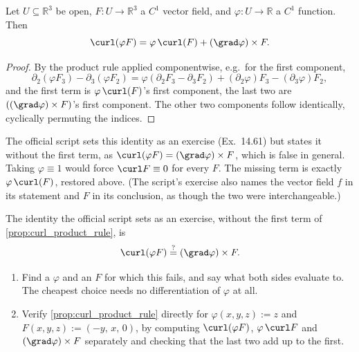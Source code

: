 \begin{proposition}
\label{prop:curl_product_rule}
Let $U \subseteq \mathbb{R}^3$ be open, $F : U \to \mathbb{R}^3$ a $C^1$ vector field, and
$\varphi : U \to \mathbb{R}$ a $C^1$ function. Then
\[\curl(\varphi F) = \varphi\,\curl(F) + (\grad\varphi)\times F.\]
\end{proposition}

\begin{proof}
By the product rule applied componentwise, e.g.\ for the first component,
\[\partial_2(\varphi F_3) - \partial_3(\varphi F_2)
  = \varphi(\partial_2F_3-\partial_3F_2) + (\partial_2\varphi)F_3 - (\partial_3\varphi)F_2,\]
and the first term is $\varphi\,\curl(F)$'s first component, the last two are
$((\grad\varphi)\times F)$'s first component. The other two components follow identically,
cyclically permuting the indices.
\end{proof}

\begin{ainote}
The official script sets this identity as an exercise (Ex.\ 14.61) but states it without the
first term, as $\curl(\varphi F) = (\grad\varphi)\times F$, which is false in general. Taking
$\varphi\equiv1$ would force $\curl F \equiv 0$ for every $F$. The missing term is exactly
$\varphi\,\curl(F)$, restored above. (The script's exercise also names the vector field $f$ in
its statement and $F$ in its conclusion, as though the two were interchangeable.)
\end{ainote}

\begin{aiexercise}
\label{ex:ai_curl_product_rule_counterexample}
The identity the official script sets as an exercise, without the first term of
\cref{prop:curl_product_rule}, is
\[\curl(\varphi F) \overset{?}{=} (\grad\varphi)\times F.\]
\begin{enumerate}[label=\textbf{(\alph*)}]
  \item Find a $\varphi$ and an $F$ for which this fails, and say what both sides evaluate to.
    The cheapest choice needs no differentiation of $\varphi$ at all.
  \item Verify \cref{prop:curl_product_rule} directly for $\varphi(x,y,z) := z$ and
    $F(x,y,z) := (-y,\,x,\,0)$, by computing $\curl(\varphi F)$, $\varphi\,\curl F$ and
    $(\grad\varphi)\times F$ separately and checking that the last two add up to the first.
\end{enumerate}
\end{aiexercise}

